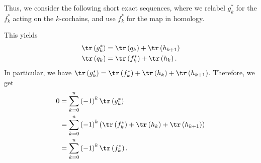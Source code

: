 \documentclass[10pt]{mypackage}
\begin{document}
\begin{solution}
  Thus, we consider the following short exact sequences, where we relabel $g_k^{\ast}$ for the $f_k^{\ast}$ acting on the $k$-cochains, and use $f_k^{\ast}$ for the map in homology.
  \begin{center}
  \end{center}
  This yields
  \begin{align*}
    \tr\left( g_k^{\ast} \right) &= \tr\left( q_k \right) + \tr\left( h_{k+1} \right)\\
    \tr\left( q_k \right) &= \tr\left( f_k^{\ast} \right) + \tr\left( h_k \right).
  \end{align*}
  In particular, we have $\tr\left( g_k^{\ast} \right) = \tr\left( f_k^{\ast} \right) + \tr\left( h_{k} \right) + \tr\left( h_{k+1} \right)$. Therefore, we get
  \begin{align*}
    0 &= \sum_{k=0}^{n} \left( -1 \right)^{k} \tr\left( g_k^{\ast} \right)\\
      &= \sum_{k=0}^{n} \left( -1 \right)^{k} \left( \tr\left( f_k^{\ast} \right) + \tr\left( h_k \right) + \tr\left( h_{k+1} \right) \right)\\
      &= \sum_{k=0}^{n} \left( -1 \right)^{k} \tr\left( f_k^{\ast} \right).
  \end{align*}
\end{solution}
\end{document}
